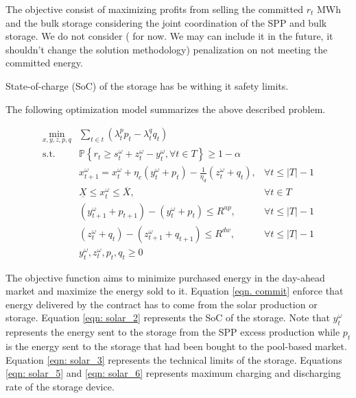\documentclass[opre,nonblindrev]{informs3} %
\newcommand{\PP}{\mathbb{P}}
\begin{document}
	The objective consist of maximizing profits from selling the committed $r_t$ MWh and the bulk storage considering the joint coordination of the SPP and bulk storage.  We do not consider ({\color{red} for now.  We may can include it in the future, it shouldn't change the solution methodology}) penalization on not meeting the committed energy. 
	
    State-of-charge (SoC) of the storage has be withing it safety limits.
	

	
	The following optimization model summarizes the above described problem. 

	{
	\begin{subequations} \label{eqn: solar_1}
	\begin{eqnarray}
		\min_{x,y,z,p,q} & \sum_{t \in t} (\lambda^p_t p_t -  \lambda_t^q q_t)     & \label{eqn: solar_obj} \\
		\mbox{s.t.} &    \PP \left\{ r_t  \geq s_t^{\omega} + z_t^\omega -  y_t^\omega,  \forall t\in T  \right\} \ge 1-\alpha & \label{eqn. commit} \\
		& x_{t+1}^\omega = x_t^\omega +  \eta_c (y_t^\omega + p_t) - \frac{1}{\eta_d} (z_t^\omega + q_t),  & \forall t \le |T|-1        \label{eqn: solar_2}\\
		& 	 \underline{X} \le x_t^\omega \le \overline{X}, & \forall t \in T 	\label{eqn: solar_3}\\
		& 	 (y_{t+1}^\omega + p_{t+1}) - (y_{t}^\omega + p_{t})  \le R^{up},  &  \forall t \le |T|-1   \label{eqn: solar_4}\\
		& 	 (z_{t}^\omega + q_{t}) - (z_{t+1}^\omega + q_{t+1})  \le R^{dw},  &  \forall t \le |T|-1   \label{eqn: solar_5} \\
		 & y_{t}^\omega, z_{t}^\omega , p_t, q_t  \ge 0 & \label{eqn: solar_6} 
	\end{eqnarray}
	\end{subequations}
	}

The objective function aims to minimize purchased energy in the day-ahead market and maximize the energy sold to it. Equation \eqref{eqn. commit} enforce that energy delivered by the contract has to come from the solar production or storage. Equation \eqref{eqn: solar_2} represents the SoC of the storage. Note that $y_t^\omega$ represents the energy sent to the storage from the SPP excess production while $p_t$ is the energy sent to the storage that had been bought to the pool-based market. Equation \eqref{eqn: solar_3} represents the technical limits of the storage.  Equations \eqref{eqn: solar_5} and \eqref{eqn: solar_6} represents maximum charging and discharging rate of the storage device. 





	
	
	
	
\end{document}

